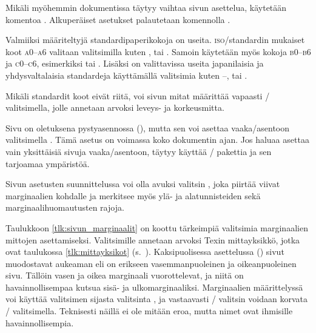 Mikäli myöhemmin dokumentissa täytyy vaihtaa sivun asettelua, käytetään
komentoa . Alkuperäiset asetukset palautetaan
komennolla .

\begin{koodilohkosis}
  \restoregeometry     %
\end{koodilohkosis}

Valmiiksi määriteltyjä standardipaperikokoja on useita.
\textsc{iso}\-/standardin mukaiset koot \textsc{a0}--\textsc{a6}
valitaan valitsimilla kuten  ,
 tai . Samoin käytetään myös kokoja
\textsc{b0}--\textsc{b6} ja \textsc{c0}--\textsc{c6}, esimerkiksi
 tai . Lisäksi on valittavissa useita
japanilaisia ja yhdysvaltalaisia standardeja käyttämällä valitsimia
kuten --,  tai
.

Mikäli standardit koot eivät riitä, voi sivun mitat määrittää vapaasti
\-/ valitsimella, jolle annetaan arvoksi leveys- ja
korkeusmitta.

\begin{koodilohkosis}
\end{koodilohkosis}

Sivu on oletuksena pystyasennossa (), mutta sen voi
asettaa vaaka\-/asentoon valitsimella . Tämä asetus on
voimassa koko dokumentin ajan. Jos haluaa asettaa vain yksittäisiä
sivuja vaaka\-/asentoon, täytyy käyttää \-/
pakettia ja sen tarjoamaa ympäristöä.

Sivun asetusten suunnittelussa voi olla avuksi valitsin
, joka piirtää viivat marginaalien kohdalle ja
merkitsee myös ylä- ja alatunnisteiden sekä marginaalihuomautusten
rajoja.

Taulukkoon \ref{tlk:sivun_marginaalit} on koottu tärkeimpiä valitsimia
marginaalien mittojen asettamiseksi. Valitsimille annetaan arvoksi Texin
mittayksikkö, jotka ovat taulukossa \ref{tlk:mittayksikot}
(s.~\pageref{tlk:mittayksikot}). Kaksipuolisessa
 
asettelussa () sivut muodostavat aukeaman eli
on erikseen vasemmanpuoleinen ja oikeanpuoleinen sivu. Tällöin vasen ja
oikea marginaali vuorottelevat, ja niitä on havainnollisempaa kutsua
sisä- ja ulkomarginaaliksi. Marginaalien määrittelyssä voi käyttää
valitsimen  sijasta valitsinta , ja vastaavasti
\-/ valitsin voidaan korvata \-/ valitsimella.
Teknisesti näillä ei ole mitään eroa, mutta nimet ovat ihmisille
havainnollisempia.

